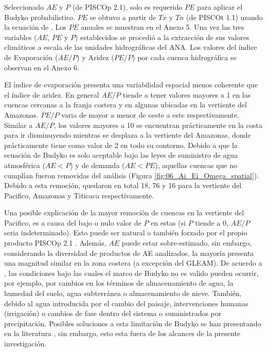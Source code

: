 \documentclass[12pt]{article}
\begin{document}
Seleccionado $AE$ y $P$ (de PISCOp 2.1), solo es requerido $PE$ para aplicar el Budyko probabilistico. $PE$ se obtuvo a partir de $Tx$ y $Tn$ (de PISCOt 1.1) usando la ecuación de \citet{Hargreaves1985}. Los $PE$ anuales se muestran en el Anexo 5. Una vez las tres variables ($AE$, $PE$ y $P$) establecidos se procedió a la extracción de sus valores climáticos a escala de las unidades hidrográficas del ANA. Los valores del índice de Evaporación ($AE/P$) y Aridez ($PE/P$) por cada cuenca hidrográfica se observan en el Anexo 6. 

El índice de evaporación presenta una variabilidad espacial menos coherente que el índice de aridez. En general $AE/P$ tiende a tener valores mayores a 1 en las cuencas cercanas a la franja costera y en algunas ubicadas en la vertiente del Amazonas. $PE/P$ varia de mayor a menor de oeste a este respectivamente. Similar a $AE/P$, los valores mayores a 10 se encuentran prácticamente en la costa para ir disminuyendo mientras se desplaza a la vertiente del Amazonas, donde prácticamente tiene como valor de 2 en todo su contorno. Debido a que la ecuación de Budyko es solo aceptable bajo las leyes de suministro de agua atmosférica ($AE < P$) y de demanda ($AE < PE$), aquellas cuencas que no cumplían fueron removidas del análisis (Figura \ref{fig:06_Ai_Ei_Omega_spatial}). Debido a esta remoción, quedaron en total 18, 76 y 16 para la vertiente del Pacifico, Amazonas y Titicaca respectivamente.



Una posible explicación de la mayor remoción de cuencas en la vertiente del Pacifico, es a causa del bajo o nulo valor de $P$ en estas (si $P$ tiende a 0, $AE/P$ seria indeterminado). Esto puede ser natural o también forzado por el propio producto PISCOp 2.1 \citep{Aybar2019}. Además, $AE$ puede estar sobre-estimado, sin embargo, considerando la diversidad de productos de AE analizados, la mayoría presenta una magnitud similar en la zona costera (a excepción del GLEAM). De acuerdo a \citet{greve2016two}, las condiciones bajo las cuales el marco de Budyko no es valido pueden ocurrir, por ejemplo, por cambios en los términos de almacenamiento de agua, la humedad del suelo, agua subterránea o almacenamiento de nieve. También, debido al agua introducida por el cambio del paisaje, intervenciones humanas (irrigación) o cambios de fase dentro del sistema o suministrados por precipitación. Posibles soluciones a esta limitación de Budyko se han presentando en la literatura \citep{greve2016two,moussa2016budyko,fathi2019new}, sin embargo, esto esta fuera de los alcances de la presente investigación. 
\end{document}
